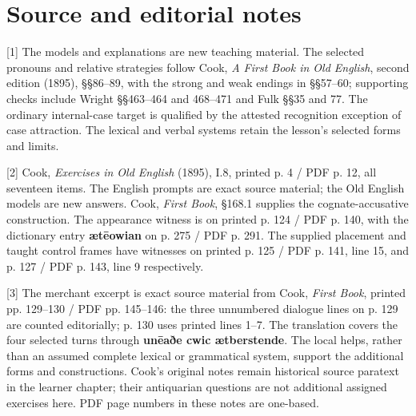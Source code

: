 \clearpage
\section*{Source and editorial notes}

\begingroup\fontsize{10}{12.8}\selectfont
[1] The models and explanations are new teaching material. The selected pronouns and relative strategies follow Cook, \emph{A First Book in Old English}, second edition (1895), §§86–89, with the strong and weak endings in §§57–60; supporting checks include Wright §§463–464 and 468–471 and Fulk §§35 and 77. The ordinary internal-case target is qualified by the attested recognition exception of case attraction. The lexical and verbal systems retain the lesson's selected forms and limits.

[2] Cook, \emph{Exercises in Old English} (1895), I.8, printed p. 4 /\allowbreak{} PDF p. 12, all seventeen items. The English prompts are exact source material; the Old English models are new answers. Cook, \emph{First Book}, §168.1 supplies the cognate-accusative construction. The appearance witness is on printed p. 124 /\allowbreak{} PDF p. 140, with the dictionary entry \textbf{ætēowian} on p. 275 /\allowbreak{} PDF p. 291. The supplied placement and taught control frames have witnesses on printed p. 125 /\allowbreak{} PDF p. 141, line 15, and p. 127 /\allowbreak{} PDF p. 143, line 9 respectively.

[3] The merchant excerpt is exact source material from Cook, \emph{First Book}, printed pp. 129–130 /\allowbreak{} PDF pp. 145–146: the three unnumbered dialogue lines on p. 129 are counted editorially; p. 130 uses printed lines 1–7. The translation covers the four selected turns through \textbf{unēaðe cwic ætberstende}. The local helps, rather than an assumed complete lexical or grammatical system, support the additional forms and constructions. Cook's original notes remain historical source paratext in the learner chapter; their antiquarian questions are not additional assigned exercises here. PDF page numbers in these notes are one-based.

\endgroup

